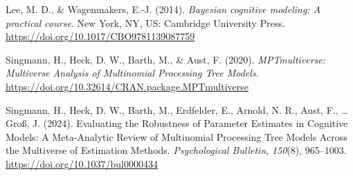 \documentclass[
  doc,floatsintext]{apa6}
\newlength{\cslhangindent}
\newenvironment{CSLReferences}[2] %
 {\begin{list}{}{%
  \setlength{\itemindent}{0pt}
  \setlength{\leftmargin}{0pt}
  \setlength{\parsep}{0pt}
  \ifodd #1
   \setlength{\leftmargin}{\cslhangindent}
   \setlength{\itemindent}{-1\cslhangindent}
  \fi
  \setlength{\itemsep}{#2\baselineskip}}}
 {\end{list}}
\begin{document}
\begin{CSLReferences}{1}{0}
Lee, M. D., \& Wagenmakers, E.-J. (2014). \emph{Bayesian cognitive modeling: {A} practical course}. New York, NY, US: Cambridge University Press. \url{https://doi.org/10.1017/CBO9781139087759}

Singmann, H., Heck, D. W., Barth, M., \& Aust, F. (2020). \emph{{MPTmultiverse}: {Multiverse Analysis} of {Multinomial Processing Tree Models}}. \url{https://doi.org/10.32614/CRAN.package.MPTmultiverse}

Singmann, H., Heck, D. W., Barth, M., Erdfelder, E., Arnold, N. R., Aust, F., \ldots{} Groß, J. (2024). Evaluating the {Robustness} of {Parameter Estimates} in {Cognitive Models}: {A Meta-Analytic Review} of {Multinomial Processing Tree Models Across} the {Multiverse} of {Estimation Methods}. \emph{Psychological Bulletin}, \emph{150}(8), 965--1003. \url{https://doi.org/10.1037/bul0000434}

\end{CSLReferences}
\end{document}
